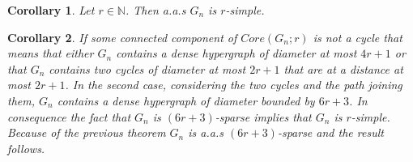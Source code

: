 \documentclass[12pt,notitlepage,a4paper]{article}
\newtheorem{corollary}{Corollary}[section]
\theoremstyle{definition}
\newcommand{\N}{\mathbb{N}}
\begin{document}
\begin{corollary}\label{cor:simple}
	Let $r\in \N$. Then a.a.s $G_n$ is $r$-simple.
\end{corollary}
\begin{corollary}
	If some connected component of $Core(G_n;r)$ is not a cycle that means
	that either $G_n$ contains a dense hypergraph of diameter at most $4r+1$
	or that $G_n$ contains two cycles of diameter at most $2r+1$ that are at
	a distance at most $2r+1$. In the second case, considering the two cycles
	and the path joining them, $G_n$ contains a dense hypergraph of diameter
	bounded by $6r+3$. In consequence the fact that $G_n$ is $(6r+3)$-sparse
	implies that $G_n$ is $r$-simple. Because of the previous theorem 
	$G_n$ is a.a.s $(6r+3)$-sparse and the result follows. 
\end{corollary}
\end{document}
